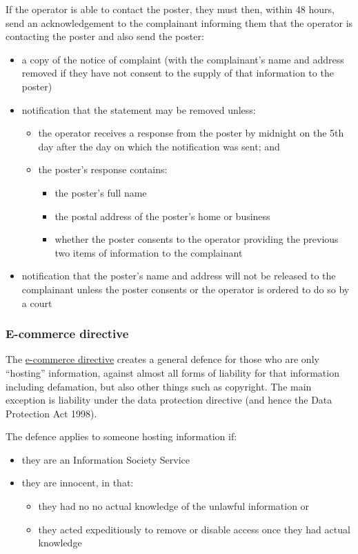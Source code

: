 \documentclass[]{article}
\begin{document}
If the operator is able to contact the poster, they must then, within 48 hours, send an acknowledgement to the complainant informing them that the operator is contacting the poster and also send the poster:

\begin{itemize}
\item a copy of the notice of complaint (with the complainant's name and address removed if they have not consent to the supply of that information to the poster)
\item notification that the statement may be removed unless:
  \begin{itemize}
  \item the operator receives a response from the poster by midnight on the 5th day after the day on which the notification was sent; and
  \item the poster's response contains:
    \begin{itemize}
    \item the poster's full name
    \item the postal address of the poster's home or business
    \item whether the poster consents to the operator providing the previous two items of information to the complainant
    \end{itemize}
  \end{itemize}
\item notification that the poster's name and address will not be released to the complainant unless the poster consents or the operator is ordered to do so by a court
\end{itemize}



\subsubsection{E-commerce directive}

The \href{http://eur-lex.europa.eu/legal-content/en/ALL/?uri=CELEX:32000L0031}{e-commerce directive} creates a general defence for those who are only ``hosting'' information, against almost all forms of liability for that information
including defamation, but also other things such as copyright. The main exception is liability under the data protection directive (and hence the Data Protection Act 1998). 

The defence applies to someone hosting information if:

\begin{itemize}
\item
  they are an Information Society Service
\item
  they are innocent, in that:

  \begin{itemize}
  \item
    they had no no actual knowledge of the unlawful information or
  \item
    they acted expeditiously to remove or disable access once they had actual knowledge
  \end{itemize}
\end{itemize}
\end{document}
